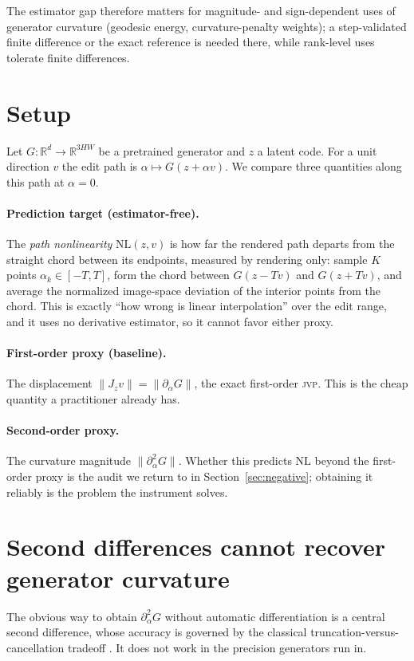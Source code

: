 \documentclass[10pt]{article}
\newcommand{\R}{\mathbb{R}}
\newcommand{\jvp}{\textsc{jvp}}
\begin{document}
The estimator gap therefore matters for magnitude- and sign-dependent uses of generator
curvature (geodesic energy, curvature-penalty weights); a step-validated finite difference or
the exact reference is needed there, while rank-level uses tolerate finite differences.

\section{Setup}
\label{sec:setup}
Let $G:\R^{d}\to\R^{3HW}$ be a pretrained generator and $z$ a latent code. For a unit
direction $v$ the edit path is $\alpha\mapsto G(z+\alpha v)$. We compare three quantities along
this path at $\alpha=0$.

\paragraph{Prediction target (estimator-free).} The \emph{path nonlinearity} $\mathrm{NL}(z,v)$
is how far the rendered path departs from the straight chord between its endpoints, measured by
rendering only: sample $K$ points $\alpha_k\in[-T,T]$, form the chord between $G(z-Tv)$ and
$G(z+Tv)$, and average the normalized image-space deviation of the interior points from the
chord. This is exactly ``how wrong is linear interpolation'' over the edit range, and it uses
no derivative estimator, so it cannot favor either proxy.

\paragraph{First-order proxy (baseline).} The displacement $\lVert J_z v\rVert =
\lVert\partial_\alpha G\rVert$, the exact first-order \jvp{}. This is the cheap quantity a
practitioner already has.

\paragraph{Second-order proxy.} The curvature magnitude $\lVert\partial_\alpha^2 G\rVert$.
Whether this predicts $\mathrm{NL}$ beyond the first-order proxy is the audit we return
to in Section~\ref{sec:negative}; obtaining it reliably is the problem the instrument solves.

\section{Second differences cannot recover generator curvature}
\label{sec:fd}
The obvious way to obtain $\partial_\alpha^2 G$ without automatic differentiation is a central
second difference, whose accuracy is governed by the classical truncation-versus-cancellation
tradeoff \citep{higham2002,press2007}. It does not work in the precision generators run in.
\end{document}
